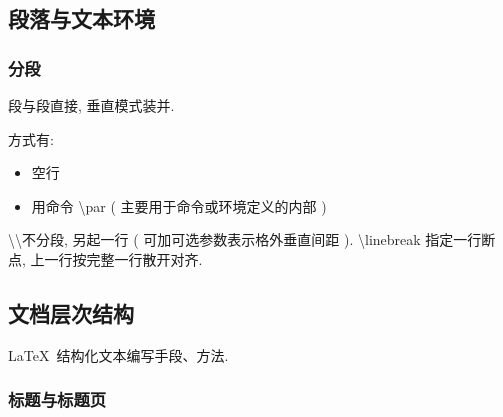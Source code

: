 \documentclass[UTF8]{ctexart}
\begin{document}
    \subsection{段落与文本环境}

            \subsubsection{分段}

                段与段直接, 垂直模式装并. 

                方式有: 
                \begin{itemize}
                    \item 空行
                    \item 用命令 \textbackslash par ( 主要用于命令或环境定义的内部 )
                \end{itemize}

                \textbackslash\textbackslash 不分段, 另起一行 ( 可加可选参数表示格外垂直间距 ). \textbackslash linebreak 指定一行断点, 上一行按完整一行散开对齐. 

    \subsection{文档层次结构}

        \LaTeX\ 结构化文本编写手段、方法.

        \subsubsection{标题与标题页}
\end{document}

